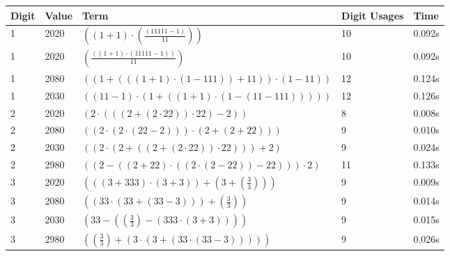 \documentclass{article}
\theoremstyle{nonumberplain}
\begin{document}
\begin{center}
    \begin{longtable}{ | l | l | p{9.5cm} | l | l | }
    \hline \textbf{Digit} & \textbf{Value} & \textbf{Term} & \textbf{Digit Usages} & \textbf{Time} \\\hline
        1 & 2020 & \( \left(\left(1 + 1\right) \cdot \left(\frac{\left(11111 - 1\right)}{11}\right)\right) \) & 10 & 0.092s \\\hline
        1 & 2020 & \( \left(\frac{\left(\left(1 + 1\right) \cdot \left(11111 - 1\right)\right)}{11}\right) \) & 10 & 0.092s \\\hline
        1 & 2080 & \( \left(\left(1 + \left(\left(\left(1 + 1\right) \cdot \left(1 - 111\right)\right) + 11\right)\right) \cdot \left(1 - 11\right)\right) \) & 12 & 0.124s \\\hline
        1 & 2030 & \( \left(\left(11 - 1\right) \cdot \left(1 + \left(\left(1 + 1\right) \cdot \left(1 - \left(11 - 111\right)\right)\right)\right)\right) \) & 12 & 0.126s \\\hline
        2 & 2020 & \( \left(2 \cdot \left(\left(\left(2 + \left(2 \cdot 22\right)\right) \cdot 22\right) - 2\right)\right) \) & 8 & 0.008s \\\hline
        2 & 2080 & \( \left(\left(2 \cdot \left(2 \cdot \left(22 - 2\right)\right)\right) \cdot \left(2 + \left(2 + 22\right)\right)\right) \) & 9 & 0.010s \\\hline
        2 & 2030 & \( \left(\left(2 \cdot \left(2 + \left(\left(2 + \left(2 \cdot 22\right)\right) \cdot 22\right)\right)\right) + 2\right) \) & 9 & 0.024s \\\hline
        2 & 2980 & \( \left(\left(2 - \left(\left(2 + 22\right) \cdot \left(\left(2 \cdot \left(2 - 22\right)\right) - 22\right)\right)\right) \cdot 2\right) \) & 11 & 0.133s \\\hline
        3 & 2020 & \( \left(\left(\left(3 + 333\right) \cdot \left(3 + 3\right)\right) + \left(3 + \left(\frac{3}{3}\right)\right)\right) \) & 9 & 0.009s \\\hline
        3 & 2080 & \( \left(\left(33 \cdot \left(33 + \left(33 - 3\right)\right)\right) + \left(\frac{3}{3}\right)\right) \) & 9 & 0.014s \\\hline
        3 & 2030 & \( \left(33 - \left(\left(\frac{3}{3}\right) - \left(333 \cdot \left(3 + 3\right)\right)\right)\right) \) & 9 & 0.015s \\\hline
        3 & 2980 & \( \left(\left(\frac{3}{3}\right) + \left(3 \cdot \left(3 + \left(33 \cdot \left(33 - 3\right)\right)\right)\right)\right) \) & 9 & 0.026s \\\hline

\end{longtable}
\end{center}
\end{document}
